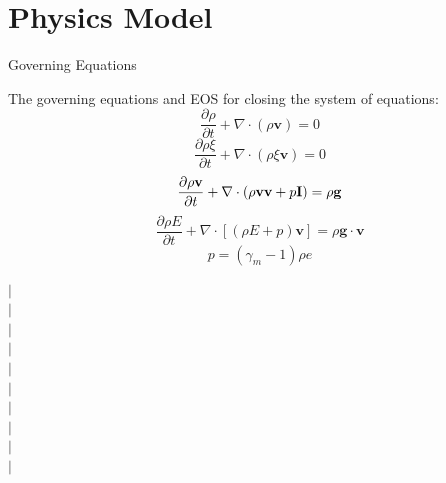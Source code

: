 \documentclass{beamer}
\begin{document}
\section{Physics Model}

\begin{frame}{Governing Equations}
\noindent
\begin{minipage}{.505\textwidth}
The governing equations and EOS for closing the system of equations:
\begin{equation}
\dfrac{\partial \rho}{\partial t} + \nabla \cdot \left(\rho \textbf{v}\right) = 0 \label{eq:gov-cs-rho}
\end{equation}
\begin{equation}
\dfrac{\partial \rho \xi}{\partial t} + \nabla \cdot \left(\rho \xi \textbf{v}\right) = 0 \label{eq:gov-cs-ks}
\end{equation}
\begin{equation}
\dfrac{\partial \rho \textbf{v}}{\partial t} + \nabla \cdot \left(\rho \textbf{v} \textbf{v} + p\textbf{I}\right) = \rho \textbf{g} \label{eq:gov-cs-v} \\
\end{equation}
\begin{equation}
\dfrac{\partial \rho E}{\partial t} + \nabla \cdot \left[\left(\rho E + p \right)\textbf{v}\right] = \rho \textbf{g} \cdot\textbf{v} \label{eq:gov-cs-e}
\end{equation}
%
\begin{equation}
p = \left(\gamma_m - 1\right)\rho e \label{eq:EOS}
\end{equation}
%
\end{minipage} %
%
\begin{minipage}{.01\textwidth}
$\vert$\\
$\vert$\\
$\vert$\\
$\vert$\\
$\vert$\\
$\vert$\\
$\vert$\\
$\vert$\\
$\vert$\\
$\vert$\\

\end{minipage}
\end{frame}
\end{document}
